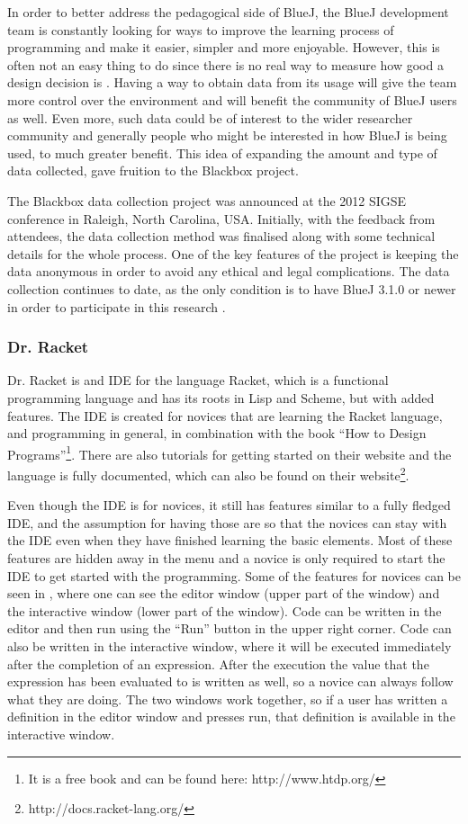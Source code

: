 In order to better address the pedagogical side of BlueJ, the BlueJ development team is constantly looking for ways to improve the learning process of programming and make it easier, simpler and more enjoyable. However, this is often not an easy thing to do since there is no real way to measure how good a design decision is \cite{bluej_blackbox}. Having a way to obtain data from its usage will give the team more control over the environment and will benefit the community of BlueJ users as well. Even more, such data could be of interest to the wider researcher community and generally people who might be interested in how BlueJ is being used, to much greater benefit. This idea of expanding the amount and type of data collected, gave fruition to the Blackbox project.

The Blackbox data collection project was announced at the 2012 SIGSE conference in Raleigh, North Carolina, USA\cite{bluej_blackbox}. Initially, with the feedback from attendees, the data collection method was finalised along with some technical details for the whole process. One of the key features of the project is keeping the data anonymous in order to avoid any ethical and legal complications. The data collection continues to date, as the only condition is to have BlueJ 3.1.0 or newer in order to participate in this research \cite{bluej_blackbox2}.

\subsubsection{Dr. Racket}
Dr. Racket is and IDE for the language Racket, which is a functional programming language and has its roots in Lisp and Scheme, but with added features. The IDE is created for novices that are learning the Racket language, and programming in general, in combination with the book ``How to Design Programs''\footnote{It is a free book and can be found here: http://www.htdp.org/}. There are also tutorials for getting started on their website and the language is fully documented, which can also be found on their website\footnote{http://docs.racket-lang.org/}.

Even though the IDE is for novices, it still has features similar to a fully fledged IDE, and the assumption for having those are so that the novices can stay with the IDE even when they have finished learning the basic elements. Most of these features are hidden away in the menu and a novice is only required to start the IDE to get started with the programming. Some of the features for novices can be seen in , where one can see the editor window (upper part of the window) and the interactive window (lower part of the window). Code can be written in the editor and then run using the ``Run'' button in the upper right corner. Code can also be written in the interactive window, where it will be executed immediately after the completion of an expression. After the execution the value that the expression has been evaluated to is written as well, so a novice can always follow what they are doing. The two windows work together, so if a user has written a definition in the editor window and presses run, that definition is available in the interactive window.

